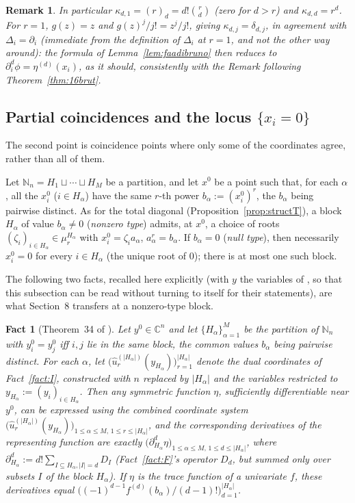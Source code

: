 \documentclass[10pt,a4paper]{amsart}
\newtheorem{fact}[theorem]{Fact}
\newtheorem{remark}[theorem]{Remark}
\newcommand{\NN}{\mathbb{N}}
\newcommand{\CC}{\mathbb{C}}
\begin{document}
\begin{remark}
In particular $\kappa_{d,1}=(r)_d=d!\binom{r}{d}$ (zero for $d>r$) and $\kappa_{d,d}=r^d$. For $r=1$, $g(z)=z$ and $g(z)^j/j!=z^j/j!$, giving $\kappa_{d,j}=\delta_{d,j}$, in agreement with $\Delta_i=\partial_i$ (immediate from the definition of $\Delta_i$ at $r=1$, and not the other way around): the formula of Lemma~\ref{lem:faadibruno} then reduces to $\partial_i^d\phi=\eta^{(d)}(x_i)$, as it should, consistently with the Remark following Theorem~\ref{thm:16brut}.
\end{remark}

\subsection{Partial coincidences and the locus $\{x_i=0\}$}

The second point is coincidence points where only some of the coordinates agree, rather than all of them.

Let $\NN_n=H_1\sqcup\cdots\sqcup H_M$ be a partition, and let $x^0$ be a point such that, for each $\alpha$, all the $x_i^0$ ($i\in H_\alpha$) have the same $r$-th power $b_\alpha:=(x_i^0)^r$, the $b_\alpha$ being pairwise distinct. As for the total diagonal (Proposition~\ref{prop:structT}), a block $H_\alpha$ of value $b_\alpha\ne0$ (\emph{nonzero type}) admits, at $x^0$, a choice of roots $(\zeta_i)_{i\in H_\alpha}\in\mu_r^{H_\alpha}$ with $x_i^0=\zeta_ia_\alpha$, $a_\alpha^r=b_\alpha$. If $b_\alpha=0$ (\emph{null type}), then necessarily $x_i^0=0$ for every $i\in H_\alpha$ (the unique root of $0$); there is at most one such block.

The following two facts, recalled here explicitly (with $y$ the variables of \cite{Ze}, so that this subsection can be read without turning to \cite{Ze} itself for their statements), are what Section~8 transfers at a nonzero-type block.

\begin{fact}[Theorem~34 of \cite{Ze}]\label{fact:M}
Let $y^0\in\CC^n$ and let $\{H_\alpha\}_{\alpha=1}^M$ be the partition of $\NN_n$ with $y_i^0=y_j^0$ iff $i,j$ lie in the same block, the common values $b_\alpha$ being pairwise distinct. For each $\alpha$, let $\big(\hat u_r^{(|H_\alpha|)}(y_{H_\alpha})\big)_{r=1}^{|H_\alpha|}$ denote the dual coordinates of Fact~\ref{fact:I}, constructed with $n$ replaced by $|H_\alpha|$ and the variables restricted to $y_{H_\alpha}:=(y_i)_{i\in H_\alpha}$. Then any symmetric function $\eta$, sufficiently differentiable near $y^0$, can be expressed using the combined coordinate system $\big(\hat u_r^{(|H_\alpha|)}(y_{H_\alpha})\big)_{1\le\alpha\le M,\,1\le r\le|H_\alpha|}$, and the corresponding derivatives of the representing function are exactly $\big(\partial_{H_\alpha}^d\eta\big)_{1\le\alpha\le M,\,1\le d\le|H_\alpha|}$, where $\partial_{H_\alpha}^d:=d!\sum_{I\subseteq H_\alpha,|I|=d}D_I$ (Fact~\ref{fact:F}'s operator $D_d$, but summed only over subsets $I$ of the block $H_\alpha$). If $\eta$ is the trace function of a univariate $f$, these derivatives equal $\big((-1)^{d-1}f^{(d)}(b_\alpha)/(d-1)!\big)_{d=1}^{|H_\alpha|}$.
\end{fact}
\end{document}
